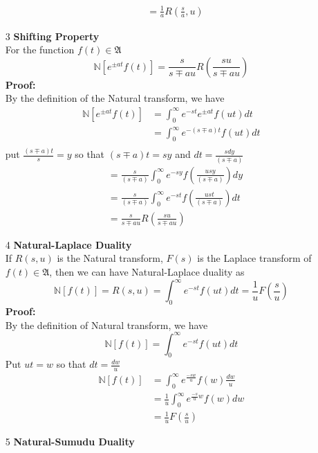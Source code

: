 \begin{enumerate}
\begin{align*}
  &=\frac{1}{a}R(\frac{s}{a},u)
 \end{align*}
 \item[3]\textbf{Shifting Property}\\
 For the function $f(t)\in \mathfrak{A} $
 \begin{equation}
 \mathbb{N}[e^{\pm at}f(t)]=\frac{s}{s\mp au}R(\frac{su}{s\mp au})
 \end{equation}
 \textbf{Proof:}\\
 By the definition of the Natural transform, we have
 \begin{align*}
 \mathbb{N}[e^{\pm at}f(t)]& = \int_{0}^{\infty}e^{-st}e^{\pm at}f(ut)dt \\
 &=\int_{0}^{\infty}e^{-(s\mp a)t}f(ut)dt\\
 \end{align*}
 put $ \frac{(s\mp a)t}{s}=y $ so that $(s\mp a)t=sy $ and $ dt=\frac{sdy}{(s\mp a)} $\\
 \begin{align*}
 &=\frac{s}{(s\mp a)}\int_{0}^{\infty}e^{-sy}f(\frac{usy}{(s\mp a)})dy\\
 &=\frac{s}{(s\mp a)}\int_{0}^{\infty}e^{-st}f(\frac{ust}{(s\mp a)})dt\\
 &=\frac{s}{s\mp au}R(\frac{su}{s\mp au})
 \end{align*}
 \item[4]\textbf{Natural-Laplace Duality}\\
 If $ R(s,u)$ is the Natural transform, $F(s)$ is the Laplace transform of $f(t) \in \mathfrak{A}$, then we  can have Natural-Laplace duality as\\
 \begin{equation}
\mathbb{N}[f(t)] = R(s,u) = \int_{0}^{\infty}e^{-st}f(ut)dt =\frac{1}{u}F(\frac{s}{u})
 \end{equation}
 \textbf{Proof:}\\
 By the definition of Natural transform, we have
 \begin{equation*}
 \mathbb{N}[f(t)] = \int_{0}^{\infty}e^{-st}f(ut)dt 
 \end{equation*}
 Put $ ut=w $ so that $ dt=\frac{dw}{u} $ 
 \begin{align*}
  \mathbb{N}[f(t)]& = \int_{0}^{\infty}e^{\frac{-sw}{u}}f(w)\frac{dw}{u}\\
  & = \frac{1}{u}\int_{0}^{\infty}e^{\frac{-s}{u}w}f(w)dw\\
&=  \frac{1}{u}F(\frac{s}{u})
 \end{align*}
 \item[5]\textbf{Natural-Sumudu Duality}\\

\end{enumerate}

